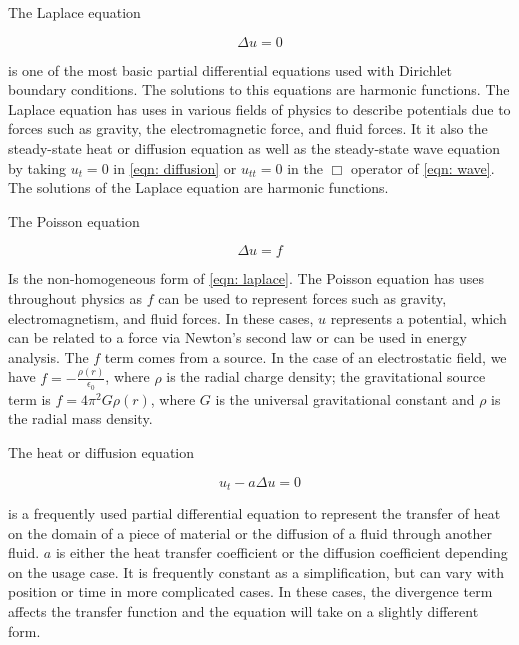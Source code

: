 \documentclass[10pt,a4paper]{article}
\begin{document}
The Laplace equation

\begin{equation}
\Delta u = 0 \label{eqn: laplace}
\end{equation}

is one of the most basic partial differential equations used with Dirichlet boundary conditions. The solutions to this equations are harmonic functions. The Laplace equation has uses in various fields of physics to describe potentials due to forces such as gravity, the electromagnetic force, and fluid forces. It it also the steady-state heat or diffusion equation as well as the steady-state wave equation by taking $u_t = 0$ in \cref{eqn: diffusion} or $u_{tt} = 0$ in the $\Box$ operator of \cref{eqn: wave}. The solutions of the Laplace equation are harmonic functions.

The Poisson equation

\begin{equation}
\Delta u = f \label{eqn: poisson}
\end{equation}

Is the non-homogeneous form of \cref{eqn: laplace}. The Poisson equation has uses throughout physics as $f$ can be used to represent forces such as gravity, electromagnetism, and fluid forces. In these cases, $u$ represents a potential, which can be related to a force via Newton's second law or can be used in energy analysis. The $f$ term comes from a source. In the case of an electrostatic field, we have $f = - \frac{\rho (r)}{\epsilon_0}$, where $\rho$ is the radial charge density; the gravitational source term is $f = 4 \pi^2 G \rho(r)$, where $G$ is the universal gravitational constant and $\rho$ is the radial mass density.

The heat or diffusion equation

\begin{equation}
u_t - a \Delta u = 0 \label{eqn: diffusion}
\end{equation}

is a frequently used partial differential equation to represent the transfer of heat on the domain of a piece of material or the diffusion of a fluid through another fluid. $a$ is either the heat transfer coefficient or the diffusion coefficient depending on the usage case. It is frequently constant as a simplification, but can vary with position or time in more complicated cases. In these cases, the divergence term affects the transfer function and the equation will take on a slightly different form.
\end{document}
